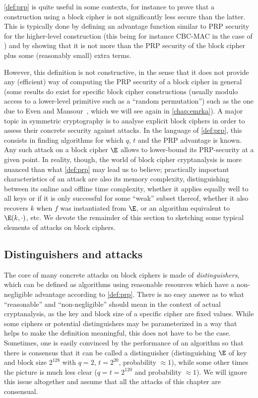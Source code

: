 \medskip

\autoref{def:prp} is quite useful in some contexts, for instance to prove that a construction using a block cipher is not significantly less secure than the latter. This is
typically done by defining an advantage function similar to PRP security for the higher-level construction (this being for instance CBC-MAC in the case of \cite{DBLP:journals/jcss/BellareKR00}) and by showing that
it is not more than the PRP security of the block cipher plus some (reasonably small) extra terms.

However, this definition is not constructive, in the sense that it does not provide any (efficient)
way of computing the PRP security of a block cipher in general (some results do exist for specific block cipher constructions (usually modulo access to a lower-level primitive such as a
``random permutation'') such as the one due to Even and Mansour~\cite{EM}, which we will see again in \autoref{chap:emrka}).
A major topic in symmetric cryptography is to analyse explicit block ciphers in order to assess their concrete security against attacks. In the language of \autoref{def:prp}, this
consists in finding algorithms for which $q$, $t$ and the PRP advantage is known. Any such attack on a block cipher $\E$ allows to lower-bound its PRP-security at a given point.
In reality, though, the world of block cipher cryptanalysis is more nuanced than what \autoref{def:prp} may lead us to believe; practically important characteristics of an attack
are also its memory complexity, distinguishing between its online and offline time complexity, whether it applies equally well to all keys or if it is only successful
for some ``weak'' subset thereof, whether it also recovers $k$ when $f$ was instantiated from $\E$, or an algorithm equivalent to $\E(k,\cdot)$, etc. We devote the remainder of this
section to sketching some typical elements of attacks on block ciphers.

\subsection{Distinguishers and attacks}
The core of many concrete attacks on block ciphers is made of \emph{distinguishers}, which can be defined as algorithms using reasonable resources which have a non-negligible advantage according to \autoref{def:prp}.
There is no easy answer as to what ``reasonable'' and ``non-negligible'' should mean in the context of actual cryptanalysis, as the key and block size of a specific cipher are fixed values. While some ciphers or potential distinguishers
may be parameterized in a way that helps to make the definition meaningful, this does not have to be the case. Sometimes, one is easily convinced by the performance of an algorithm so that there is
consensus that it can be called a distinguisher (\eg distinguishing $\E$ of key and block size $2^{128}$ with $q = 2$, $t = 2^{20}$, probability $\approx 1$), while some other times the picture is much less clear
(\eg $q = t =  2^{120}$ and probability $\approx 1$). We will ignore this issue altogether and assume that all the attacks of this chapter are consensual.

